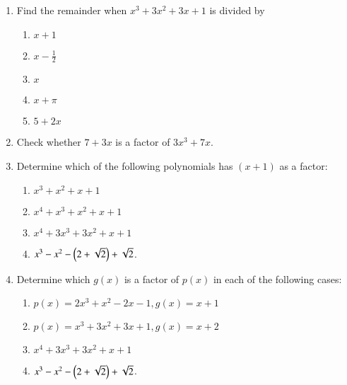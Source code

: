 \renewcommand{\theequation}{\theenumi}
\begin{enumerate}[label=\arabic*.,ref=\thesubsection.\theenumi]
\item Find the remainder when $x^3+3x^2+3x+1$ is divided by 
\begin{enumerate}
\item $x+1$
\item $x-\frac{1}{2}$
\item $x$
\item $x+\pi$
\item $5+2x$
\end{enumerate}
%
\item Check whether $7+3x$ is a factor of $3x^3+7x$.
%
\item Determine which of the following polynomials has $(x+1)$ as a factor:
%
\begin{enumerate}
\item $x^3+x^2+x+1$
\item $x^4+x^3+x^2+x+1$
\item $x^4+3x^3+3x^2+x+1$
\item $x^3-x^2-\left(2+\sqrt{2}\right)+\sqrt{2}$.
\end{enumerate}
%
\item Determine which $g(x)$ is a factor of $p(x)$ in each of the following cases:
%
\begin{enumerate}
\item $p(x) = 2x^3+x^2-2x-1, g(x) = x+1$
\item $p(x) = x^3+3x^2+3x+1, g(x) = x+2$
\item $x^4+3x^3+3x^2+x+1$
\item $x^3-x^2-\left(2+\sqrt{2}\right)+\sqrt{2}$.
\end{enumerate}
\end{enumerate}
